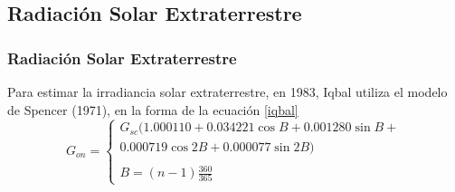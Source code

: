 \documentclass{beamer}
\begin{document}
\subsection{Radiación Solar Extraterrestre}
\begin{frame}
   \frametitle{Radiación Solar Extraterrestre}
   Para estimar la irradiancia solar extraterrestre, en 1983, Iqbal utiliza el modelo de
   Spencer (1971), en la forma de la ecuación \ref{iqbal}
   \begin{equation}
      \label{iqbal}
      G_{on} = \begin{cases}
           G_{sc}(1.000110 + 0.034221 \cos B + 0.001280\sin B +
                    \\ 0.000719 \cos 2B + 0.000077 \sin 2B)\\
           \\
           \boxed{B = (n - 1) \frac{360}{365}}\end{cases}
   \end{equation}
\end{frame}
\end{document}
